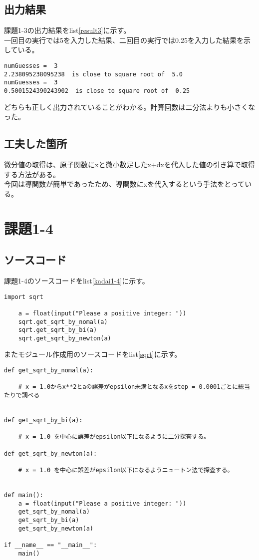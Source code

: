 \documentclass[a4paper]{ltjsarticle}
\begin{document}
\subsection*{出力結果}
課題1-3の出力結果をlist\ref{result3}に示す。
\\一回目の実行では5を入力した結果、二回目の実行では0.25を入力した結果を示している。
\begin{lstlisting}[caption=output, label=result3]
numGuesses =  3
2.238095238095238  is close to square root of  5.0
numGuesses =  3
0.5001524390243902  is close to square root of  0.25
\end{lstlisting}
どちらも正しく出力されていることがわかる。計算回数は二分法よりも小さくなった。

\subsection*{工夫した箇所}
微分値の取得は、原子関数にxと微小数足したx+dxを代入した値の引き算で取得する方法がある。
\\今回は導関数が簡単であったため、導関数にxを代入するという手法をとっている。
\newpage

\section*{課題1-4}
\subsection*{ソースコード}
課題1-4のソースコードをlist\ref{kadai1-4}に示す。
\begin{lstlisting}[caption=kadai1-4.py,label=kadai1-4]
    import sqrt

    a = float(input("Please a positive integer: "))
    sqrt.get_sqrt_by_nomal(a)
    sqrt.get_sqrt_by_bi(a)
    sqrt.get_sqrt_by_newton(a)
\end{lstlisting}
またモジュール作成用のソースコードをlist\ref{sqrt}に示す。
\begin{lstlisting}[caption=sqrt.py,label=sqrt]
def get_sqrt_by_nomal(a):

    # x = 1.0からx**2とaの誤差がepsilon未満となるxをstep = 0.0001ごとに総当たりで調べる


def get_sqrt_by_bi(a):

    # x = 1.0 を中心に誤差がepsilon以下になるように二分探査する。

def get_sqrt_by_newton(a):

    # x = 1.0 を中心に誤差がepsilon以下になるようニュートン法で探査する。


def main():
    a = float(input("Please a positive integer: "))
    get_sqrt_by_nomal(a)
    get_sqrt_by_bi(a)
    get_sqrt_by_newton(a)

if __name__ == "__main__":
    main()
\end{lstlisting}
\newpage
\end{document}
